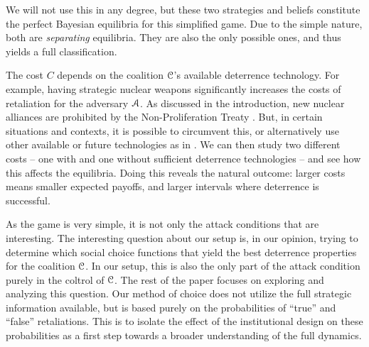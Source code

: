 \begin{remark}
    We will not use this in any degree, but these two strategies and beliefs constitute the perfect Bayesian equilibria for this simplified game. Due to the simple nature, both are \emph{separating} equilibria. They are also the only possible ones, and thus yields a full classification. 
\end{remark}

\begin{remark}
    The cost $C$ depends on the coalition $\EuScript{C}$'s available deterrence technology. For example, having strategic nuclear weapons significantly increases the costs of retaliation for the adversary $\EuScript{A}$. As discussed in the introduction, new nuclear alliances are prohibited by the Non-Proliferation Treaty \parencite{NPT_1968}. But, in certain situations and contexts, it is possible to circumvent this, or alternatively use other available or future technologies as in \parencite{EuropeanNuclearPlanningGroup}. We can then study two different costs -- one with and one without sufficient deterrence technologies -- and see how this affects the equilibria. Doing this reveals the natural outcome: larger costs means smaller expected payoffs, and larger intervals where deterrence is successful. 
\end{remark}

As the game is very simple, it is not only the attack conditions that are interesting. The interesting question about our setup is, in our opinion, trying to determine which social choice functions that yield the best deterrence properties for the coalition $\EuScript{C}$. In our setup, this is also the only part of the attack condition purely in the coltrol of $\EuScript{C}$. The rest of the paper focuses on exploring and analyzing this question. Our method of choice does not utilize the full strategic information available, but is based purely on the probabilities of ``true'' and ``false'' retaliations. This is to isolate the effect of the institutional design on these probabilities as a first step towards a broader understanding of the full dynamics.  





